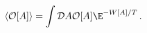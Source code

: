 \begin{equation}
\langle {\cal O}[A] \rangle =
\int {\cal D}A {\cal O}[A] \E^{-W[A]/T} \, .
\label{eq43}
\end{equation}

